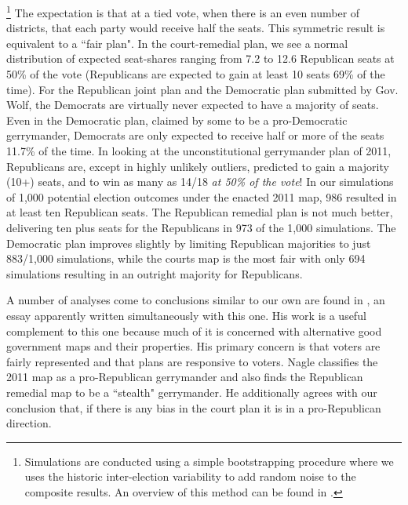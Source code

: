     \footnote{Simulations are conducted using a simple bootstrapping procedure where we uses the historic inter-election variability to add random noise to the composite results. An overview of this method can be found in \citet{Efron1979}.}
    The expectation is that at a tied vote, when there is an even number of districts, that each party would receive half the seats. This symmetric result is equivalent to a ``fair plan". In the court-remedial plan, we see a normal distribution of expected seat-shares ranging from 7.2 to 12.6 Republican seats at 50\% of the vote (Republicans are expected to gain at least 10 seats 69\% of the time). For the Republican joint plan and the Democratic plan submitted by Gov. Wolf, the Democrats are virtually never expected to have a majority of seats. Even in the Democratic plan, claimed by some to be a pro-Democratic gerrymander, Democrats are only expected to receive half or more of the seats 11.7\% of the time. In looking at the unconstitutional gerrymander plan of 2011, Republicans are, except in highly unlikely outliers, predicted to gain a majority (10+) seats, and to win as many as 14/18 \textit{at 50\% of the vote}! In our simulations of 1,000 potential election outcomes under the enacted 2011 map, 986 resulted in at least ten Republican seats. The Republican remedial plan is not much better, delivering ten plus seats for the Republicans in 973 of the 1,000 simulations. The Democratic plan improves slightly by limiting Republican majorities to just 883/1,000 simulations, while the courts map is the most fair with only 694 simulations resulting in an outright majority for Republicans. 
\par
    A number of analyses come to conclusions similar to our own are found in \citet{Nagle2019_ELJ}, an essay apparently written simultaneously with this one. His work is a useful complement to this one because much of it is concerned with alternative good government maps and their properties. His primary concern is that voters are fairly represented and that plans are responsive to voters. Nagle classifies the 2011 map as a pro-Republican gerrymander and also finds the Republican remedial map to be a ``stealth" gerrymander. He additionally agrees with our conclusion that, if there is any bias in the court plan it is in a pro-Republican direction.
